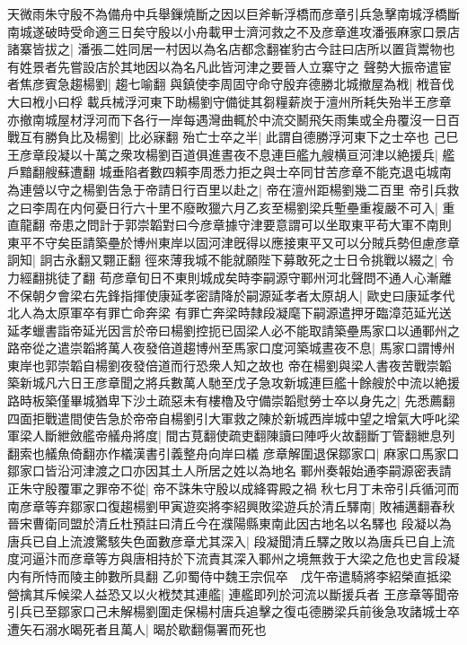 天微雨朱守殷不為備舟中兵舉鏁燒斷之因以巨斧斬浮橋而彦章引兵急擊南城浮橋斷南城遂破時受命適三日矣守殷以小舟載甲士濟河救之不及彦章進攻潘張麻家口景店諸寨皆拔之|{
	潘張二姓同居一村因以為名店都念翻崔豹古今註曰店所以置貨鬻物也有姓景者先嘗設店於其地因以為名凡此皆河津之要晉人立寨守之}
聲勢大振帝遣宦者焦彦賓急趨楊劉|{
	趨七喻翻}
與鎮使李周固守命守殷弃德勝北城撤屋為栰|{
	栰音伐大曰栰小曰桴}
載兵械浮河東下助楊劉守備徙其芻糧薪炭于澶州所耗失殆半王彦章亦撤南城屋材浮河而下各行一岸每遇灣曲輒於中流交鬭飛矢雨集或全舟覆沒一日百戰互有勝負比及楊劉|{
	比必寐翻}
殆亡士卒之半|{
	此謂自德勝浮河東下之士卒也}
己巳王彦章段凝以十萬之衆攻楊劉百道俱進晝夜不息連巨艦九艘横亘河津以絶援兵|{
	艦戶黯翻艘蘇遭翻}
城垂陷者數四賴李周悉力拒之與士卒同甘苦彦章不能克退屯城南為連營以守之楊劉告急于帝請日行百里以赴之|{
	帝在澶州距楊劉幾二百里}
帝引兵救之曰李周在内何憂日行六十里不廢畋獵六月乙亥至楊劉梁兵塹壘重複嚴不可入|{
	重直龍翻}
帝患之問計于郭崇韜對曰今彦章據守津要意謂可以坐取東平苟大軍不南則東平不守矣臣請築壘於博州東岸以固河津旣得以應接東平又可以分賊兵勢但慮彦章詗知|{
	詗古永翻又翾正翻}
徑來薄我城不能就願陛下募敢死之士日令挑戰以綴之|{
	令力經翻挑徒了翻}
苟彦章旬日不東則城成矣時李嗣源守鄆州河北聲問不通人心漸離不保朝夕會梁右先鋒指揮使康延孝密請降於嗣源延孝者太原胡人|{
	歐史曰康延孝代北人為太原軍卒有罪亡命奔梁}
有罪亡奔梁時隸段凝麾下嗣源遣押牙臨漳范延光送延孝蠟書詣帝延光因言於帝曰楊劉控扼已固梁人必不能取請築壘馬家口以通鄆州之路帝從之遣崇韜將萬人夜發倍道趨博州至馬家口度河築城晝夜不息|{
	馬家口謂博州東岸也郭崇韜自楊劉夜發倍道而行恐衆人知之故也}
帝在楊劉與梁人書夜苦戰崇韜築新城凡六日王彦章聞之將兵數萬人馳至戊子急攻新城連巨艦十餘艘於中流以絶援路時板築僅畢城猶卑下沙土疏惡未有樓櫓及守備崇韜慰勞士卒以身先之|{
	先悉薦翻}
四面拒戰遣間使告急於帝帝自楊劉引大軍救之陳於新城西岸城中望之增氣大呼叱梁軍梁人斷紲斂艦帝艤舟將度|{
	間古莧翻使疏吏翻陳讀曰陣呼火故翻斷丁管翻紲息列翻索也艤魚倚翻亦作檥漢書引義整舟向岸曰檥}
彦章解圍退保鄒家口|{
	麻家口馬家口鄒家口皆沿河津渡之口亦因其土人所居之姓以為地名}
鄆州奏報始通李嗣源密表請正朱守殷覆軍之罪帝不從|{
	帝不誅朱守殷以成絳霄殿之禍}
秋七月丁未帝引兵循河而南彦章等弃鄒家口復趨楊劉甲寅遊奕將李紹興敗梁遊兵於清丘驛南|{
	敗補邁翻春秋晉宋曹衛同盟於清丘杜預註曰清丘今在濮陽縣東南此因古地名以名驛也}
段凝以為唐兵已自上流渡驚駭失色面數彦章尤其深入|{
	段凝聞清丘驛之敗以為唐兵已自上流度河逼汴而彦章等方與唐相持於下流責其深入鄆州之境無救于大梁之危也史言段凝内有所恃而陵主帥數所具翻}
乙卯蜀侍中魏王宗侃卒　戊午帝遣騎將李紹榮直抵梁營擒其斥候梁人益恐又以火栰焚其連艦|{
	連艦即列於河流以斷援兵者}
王彦章等聞帝引兵已至鄒家口己未解楊劉圍走保楊村唐兵追擊之復屯德勝梁兵前後急攻諸城士卒遭矢石溺水暍死者且萬人|{
	暍於歇翻傷署而死也}
